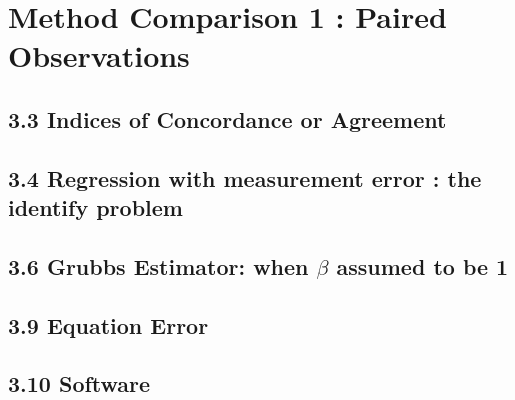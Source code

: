 
\section{Method Comparison 1 : Paired Observations}


\subsection{3.3 Indices of Concordance or Agreement }


\subsection{3.4 Regression with measurement error : the identify problem}


\subsection{3.6 Grubbs Estimator: when $\beta$ assumed to be 1}


\subsection{3.9 Equation Error}


\subsection{3.10 Software}
